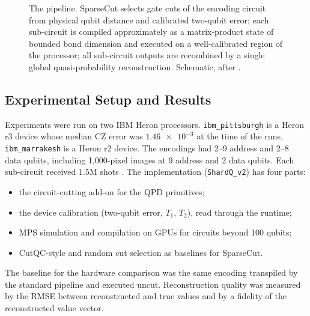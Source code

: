 \begin{figure}[htbp]
\caption{The \shardq{} pipeline. SparseCut selects gate cuts of the encoding circuit from physical qubit distance and calibrated two-qubit error; each sub-circuit is compiled approximately as a matrix-product state of bounded bond dimension and executed on a well-calibrated region of the processor; all sub-circuit outputs are recombined by a single global quasi-probability reconstruction. Schematic, after \cite{guo2025shardq}.}\label{fig:qml:shardq}
\end{figure}

\subsection{Experimental Setup and Results}\label{sec:qml:shardq:results}

Experiments were run on two IBM Heron processors. \texttt{ibm\_pittsburgh} is a Heron r3 device whose median CZ error was $\num{1.46e-3}$ at the time of the runs. \texttt{ibm\_marrakesh} is a Heron r2 device. The encodings had 2--9 address and 2--8 data qubits, including 1,000-pixel images at 9 address and 2 data qubits. Each sub-circuit received $1.5$M shots \cite{guo2025shardq}. The implementation (\texttt{ShardQ\_v2}) has four parts:
\begin{itemize}
\item the \qiskit{} circuit-cutting add-on for the QPD primitives;
\item the device calibration (two-qubit error, $T_1$, $T_2$), read through the \qiskit{} runtime;
\item MPS simulation and compilation on GPUs for circuits beyond 100 qubits;
\item CutQC-style and random cut selection as baselines for SparseCut.
\end{itemize}
The baseline for the hardware comparison was the same encoding transpiled by the standard \qiskit{} pipeline and executed uncut. Reconstruction quality was measured by the RMSE between reconstructed and true values and by a fidelity of the reconstructed value vector.

